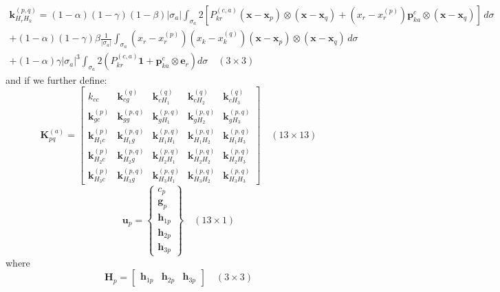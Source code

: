 \documentclass[11pt]{article} %
\begin{document}
\begin{eqnarray}
	\mathbf{k}_{H_rH_k}^{(p,q)} = (1-\alpha)(1-\gamma)(1-\beta) | \sigma_a | \int_{\sigma_a} 2 \left[ P^{(c,a)}_{kr} (\mathbf{x} - \mathbf{x}_p) \otimes (\mathbf{x} - \mathbf{x}_q) + (x_r - x^{(p)}_r) \mathbf{p}^c_{ka} \otimes (\mathbf{x} - \mathbf{x}_q) \right] \, d \sigma \nonumber \\ + (1-\alpha) (1-\gamma) \beta \frac{1}{| \sigma_a |} \int_{\sigma_a} (x_r - x^{(p)}_r) (x_k - x^{(q)}_k) (\mathbf{x} - \mathbf{x}_p) \otimes (\mathbf{x} - \mathbf{x}_q) \, d \sigma \nonumber \\ + (1-\alpha) \gamma | \sigma_a |^3 \int_{\sigma_a} 2 (P^{(c,a)}_{kr} \mathbf{1} + \mathbf{p}^c_{ka} \otimes \mathbf{e}_r) d \sigma \quad (3 \times 3) \quad
\end{eqnarray}
and if we further define:
\begin{equation}
	\mathbf{K}_{pq}^{(a)} = \left[ \begin{array}{ccccc} k_{cc} & \mathbf{k}_{cg}^{(q)} & \mathbf{k}_{cH_1}^{(q)} & \mathbf{k}_{cH_2}^{(q)} & \mathbf{k}_{cH_3}^{(q)} \\ \mathbf{k}_{gc}^{(p)} & \mathbf{k}_{gg}^{(p,q)} & \mathbf{k}_{gH_1}^{(p,q)} & \mathbf{k}_{gH_2}^{(p,q)} & \mathbf{k}_{gH_3}^{(p,q)} \\ \mathbf{k}_{H_1c}^{(p)} & \mathbf{k}_{H_1g}^{(p,q)} & \mathbf{k}_{H_1H_1}^{(p,q)} & \mathbf{k}_{H_1H_2}^{(p,q)} & \mathbf{k}_{H_1H_3}^{(p,q)} \\ \mathbf{k}_{H_2c}^{(p)} & \mathbf{k}_{H_2g}^{(p,q)} & \mathbf{k}_{H_2H_1}^{(p,q)} & \mathbf{k}_{H_2H_2}^{(p,q)} & \mathbf{k}_{H_2H_3}^{(p,q)} \\ \mathbf{k}_{H_3c}^{(p)} & \mathbf{k}_{H_3g}^{(p,q)} & \mathbf{k}_{H_3H_1}^{(p,q)} & \mathbf{k}_{H_3H_2}^{(p,q)} & \mathbf{k}_{H_3H_3}^{(p,q)} \end{array} \right] \quad (13 \times 13)
\end{equation}
\begin{equation}
	\mathbf{u}_p = \left\{ \begin{array}{c} c_p \\ \mathbf{g}_p \\ \mathbf{h}_{1p} \\ \mathbf{h}_{2p} \\ \mathbf{h}_{3p} \end{array} \right\} \quad (13 \times 1)
\end{equation}
where
\begin{equation}
	\mathbf{H}_p = \left[ \begin{array}{ccc} \mathbf{h}_{1p} & \mathbf{h}_{2p} & \mathbf{h}_{3p} \end{array} \right] \quad (3 \times 3)
\end{equation}
\end{document}
